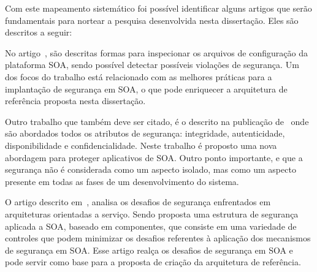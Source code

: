 Com este mapeamento sistemático foi possível identificar alguns artigos que serão fundamentais para nortear a pesquisa desenvolvida nesta dissertação. Eles são descritos a seguir:

No artigo~\cite{WeberAM07}, são descritas formas para inspecionar os arquivos de configuração da plataforma SOA, sendo possível detectar possíveis violações de segurança. Um dos focos do trabalho está relacionado com as melhores práticas para a implantação de segurança em SOA, o que pode enriquecer a arquitetura de referência proposta nesta dissertação.

Outro trabalho que também deve ser citado, é o descrito na publicação de~\cite{pattern-driven2008} onde são abordados todos os atributos de segurança: integridade, autenticidade, disponibilidade e confidencialidade. Neste trabalho é proposto uma nova abordagem para proteger aplicativos de SOA. Outro ponto importante, e que a segurança não é considerada como um aspecto isolado, mas como um aspecto presente em todas as fases de um desenvolvimento do sistema.

O artigo descrito em~\cite{Coetzee2012}, analisa os desafios de segurança enfrentados em arquiteturas orientadas a serviço. Sendo proposta uma estrutura de segurança aplicada a SOA, baseado em componentes, que consiste em uma variedade de controles que podem minimizar os desafios referentes à aplicação dos mecanismos de segurança em SOA. Esse artigo realça os desafios de segurança em SOA e pode servir como base para a proposta de criação da arquitetura de referência. 
